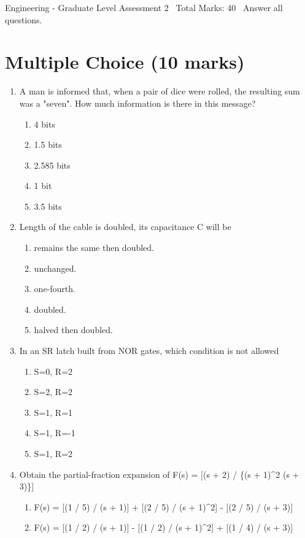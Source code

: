 \documentclass[12pt]{article}
\begin{document}
\begin{center}
Engineering - Graduate Level Assessment 2 \
Total Marks: 40 \
Answer all questions.
\end{center}

\section*{Multiple Choice (10 marks)}
\begin{enumerate}[label=\arabic*.]
\item A man is informed that, when a pair of dice were rolled, the resulting sum was a "seven".
How much information is there in this message?
\begin{enumerate}[label=(\alph*)]
    \item 4 bits
    \item 1.5 bits
    \item 2.585 bits
    \item 1 bit
    \item 3.5 bits
\end{enumerate}
\item Length of the cable is doubled, its capacitance C will be
\begin{enumerate}[label=(\alph*)]
    \item remains the same then doubled.
    \item unchanged.
    \item one-fourth.
    \item doubled.
    \item halved then doubled.
\end{enumerate}
\item In an SR latch built from NOR gates, which condition is not allowed
\begin{enumerate}[label=(\alph*)]
    \item S=0, R=2
    \item S=2, R=2
    \item S=1, R=1
    \item S=1, R=-1
    \item S=1, R=2
\end{enumerate}
\item Obtain the partial-fraction expansion of F(s) = [(s + 2) / \{(s + 1)\^{}2 (s + 3)\}]
\begin{enumerate}[label=(\alph*)]
    \item F(s) = [(1 / 5) / (s + 1)] + [(2 / 5) / (s + 1)\^{}2] - [(2 / 5) / (s + 3)]
    \item F(s) = [(1 / 2) / (s + 1)] - [(1 / 2) / (s + 1)\^{}2] + [(1 / 4) / (s + 3)]

\end{enumerate}
\end{enumerate}
\end{document}
